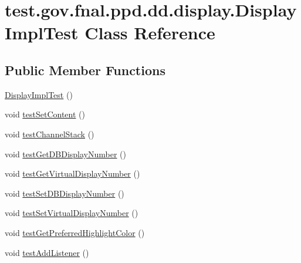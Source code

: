 \hypertarget{classtest_1_1gov_1_1fnal_1_1ppd_1_1dd_1_1display_1_1DisplayImplTest}{\section{test.\-gov.\-fnal.\-ppd.\-dd.\-display.\-Display\-Impl\-Test Class Reference}
\label{classtest_1_1gov_1_1fnal_1_1ppd_1_1dd_1_1display_1_1DisplayImplTest}
}
\subsection*{Public Member Functions}
\begin{DoxyCompactItemize}
\item 
\hyperlink{classtest_1_1gov_1_1fnal_1_1ppd_1_1dd_1_1display_1_1DisplayImplTest_af8f1b46ed894d8daf3902325ee41cff7}{Display\-Impl\-Test} ()
\item 
void \hyperlink{classtest_1_1gov_1_1fnal_1_1ppd_1_1dd_1_1display_1_1DisplayImplTest_a66cd352eba4a73730cd3092d211ce3a9}{test\-Set\-Content} ()
\item 
void \hyperlink{classtest_1_1gov_1_1fnal_1_1ppd_1_1dd_1_1display_1_1DisplayImplTest_a6320029b2d293fac5db4074ef2adbaa0}{test\-Channel\-Stack} ()
\item 
void \hyperlink{classtest_1_1gov_1_1fnal_1_1ppd_1_1dd_1_1display_1_1DisplayImplTest_a63163c6a6839bfdabb28b7abd061ce5e}{test\-Get\-D\-B\-Display\-Number} ()
\item 
void \hyperlink{classtest_1_1gov_1_1fnal_1_1ppd_1_1dd_1_1display_1_1DisplayImplTest_a7464e6e2e91ed39d87f4792d10367fb0}{test\-Get\-Virtual\-Display\-Number} ()
\item 
void \hyperlink{classtest_1_1gov_1_1fnal_1_1ppd_1_1dd_1_1display_1_1DisplayImplTest_adbd653cf64c4d65765a60c47f64a19d1}{test\-Set\-D\-B\-Display\-Number} ()
\item 
void \hyperlink{classtest_1_1gov_1_1fnal_1_1ppd_1_1dd_1_1display_1_1DisplayImplTest_a8bba7566652b48701c93c8e96a04ba5a}{test\-Set\-Virtual\-Display\-Number} ()
\item 
void \hyperlink{classtest_1_1gov_1_1fnal_1_1ppd_1_1dd_1_1display_1_1DisplayImplTest_a5878b575062d983fd455666bf9f47a02}{test\-Get\-Preferred\-Highlight\-Color} ()
\item 
void \hyperlink{classtest_1_1gov_1_1fnal_1_1ppd_1_1dd_1_1display_1_1DisplayImplTest_a0712fdc64836a4db68c6b7dc138e654b}{test\-Add\-Listener} ()
\item 

\end{DoxyCompactItemize}
